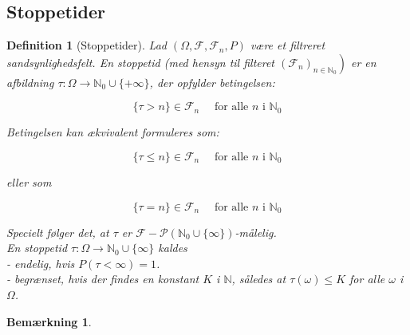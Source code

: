 \documentclass{article}
\newcommand{\1}{\mathbbm{1}}
\theoremstyle{boxed}
\newtheorem{definition}[theorem]{Definition}
\newtheorem{remark}[theorem]{Bemærkning}
\begin{document}
\subsection{Stoppetider}
\begin{theorem-box}
    \begin{definition}[Stoppetider]
        Lad $\left(\Omega, \mathcal{F}, \mathcal{F}_n, P\right)$ være et filtreret sandsynlighedsfelt.
En stoppetid (med hensyn til filteret $\left.\left(\mathcal{F}_n\right)_{n \in \mathbb{N}_0}\right)$ er en afbildning
$\tau: \Omega \rightarrow \mathbb{N}_0 \cup\{+\infty\}$, der opfylder betingelsen:

$$
\{\tau>n\} \in \mathcal{F}_n \quad \text { for alle } n \text { i } \mathbb{N}_0
$$


Betingelsen kan ækvivalent formuleres som:

$$
\{\tau \leq n\} \in \mathcal{F}_n \quad \text { for alle } n \text { i } \mathbb{N}_0
$$

eller som

$$
\{\tau=n\} \in \mathcal{F}_n \quad \text { for alle } n \text { i } \mathbb{N}_0
$$


Specielt følger det, at $\tau$ er $\mathcal{F}-\mathcal{P}\left(\mathbb{N}_0 \cup\{\infty\}\right)$-målelig.
\\En stoppetid $\tau: \Omega \rightarrow \mathbb{N}_0 \cup\{\infty\}$ kaldes
\\- endelig, hvis $P(\tau<\infty)=1$.
\\- begrænset, hvis der findes en konstant $K$ i $\mathbb{N}$, således at $\tau(\omega) \leq K$ for alle $\omega$ i $\Omega$.
\end{definition}
\end{theorem-box}
\begin{remark}
    
\end{remark}
\end{document}

